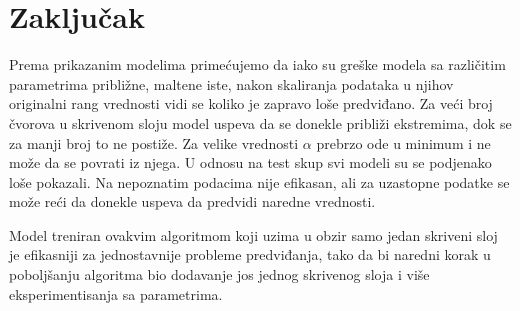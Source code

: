 \documentclass[a4paper]{article}
\begin{document}
\pagebreak

\restoregeometry
\section{Zaključak}

Prema prikazanim modelima primećujemo da iako su greške modela sa različitim parametrima približne, maltene iste, nakon skaliranja podataka u njihov originalni rang vrednosti vidi se koliko je zapravo loše predviđano. 
Za veći broj čvorova u skrivenom sloju model uspeva da se donekle približi ekstremima, dok se za manji broj to ne postiže. Za velike vrednosti $\alpha$ prebrzo ode u minimum i ne može da se povrati iz njega. U odnosu na test skup svi modeli su se podjenako loše pokazali. Na nepoznatim podacima nije efikasan, ali za uzastopne podatke se može reći da donekle uspeva da predvidi naredne vrednosti.

Model treniran ovakvim algoritmom koji uzima u obzir samo jedan skriveni sloj je efikasniji za jednostavnije probleme predviđanja, tako da bi naredni korak u poboljšanju algoritma bio dodavanje jos jednog skrivenog sloja i više eksperimentisanja sa parametrima.

\appendix
 


\end{document}
